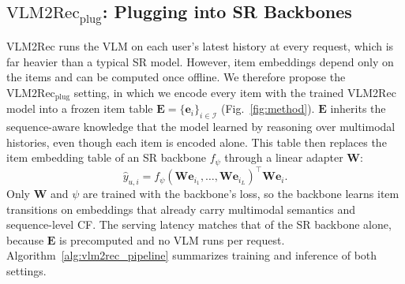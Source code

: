 \subsection{$\text{VLM2Rec}_{\text{plug}}$: Plugging into SR Backbones}
\label{sec:deployment}
VLM2Rec runs the VLM on each user's latest history at every request, which is far heavier than a typical SR model.
However, item embeddings depend only on the items and can be computed once offline.
We therefore propose the $\text{VLM2Rec}_{\text{plug}}$ setting, in which we encode every item with the trained VLM2Rec model into a frozen item table $\mathbf{E}=\{\mathbf{e}_i\}_{i\in\mathcal{I}}$ (Fig.~\ref{fig:method}).
$\mathbf{E}$ inherits the sequence-aware knowledge that the model learned by reasoning over multimodal histories, even though each item is encoded alone.
This table then replaces the item embedding table of an SR backbone $f_\psi$ through a linear adapter $\mathbf{W}$:
\begin{equation}
\hat{y}_{u,i}=f_\psi(\mathbf{W}\mathbf{e}_{i_1},\dots,\mathbf{W}\mathbf{e}_{i_L})^{\top}\mathbf{W}\mathbf{e}_i.
\label{eq:sr_score}
\end{equation}
Only $\mathbf{W}$ and $\psi$ are trained with the backbone's loss, so the backbone learns item transitions on embeddings that already carry multimodal semantics and sequence-level CF.
The serving latency matches that of the SR backbone alone, because $\mathbf{E}$ is precomputed and no VLM runs per request.
Algorithm~\ref{alg:vlm2rec_pipeline} summarizes training and inference of both settings.
